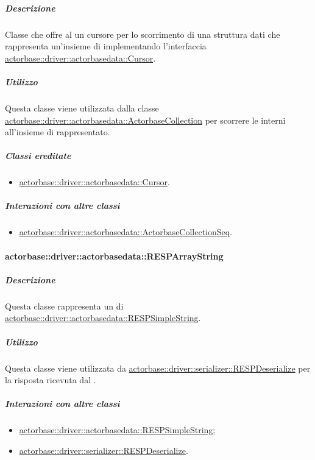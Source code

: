 \documentclass{scalatekids-article}
\begin{document}
\subparagraph{Descrizione}

Classe che offre al  un cursore per lo scorrimento di una struttura dati
che rappresenta un'insieme di  implementando l'interfaccia
\hyperref[sec:actorbase::driver::actorbasedata::Cursor]{actorbase::driver::actorbasedata::Cursor}.

\subparagraph{Utilizzo}

Questa classe viene utilizzata dalla classe
\hyperref[sec:actorbase::driver::actorbasedata::ActorbaseCollection]{actorbase::driver::actorbasedata::ActorbaseCollection}
per scorrere le  interni all'insieme di 
rappresentato.

\subparagraph{Classi ereditate}

\begin{itemize}
\item \hyperref[sec:actorbase::driver::actorbasedata::Cursor]{actorbase::driver::actorbasedata::Cursor}.
\end{itemize}

\subparagraph{Interazioni con altre classi}

\begin{itemize}
\item \hyperref[sec:actorbase::driver::actorbasedata::ActorbaseCollectionSeq]{actorbase::driver::actorbasedata::ActorbaseCollectionSeq}.
\end{itemize}

\paragraph{actorbase::driver::actorbasedata::RESPArrayString}
\label{sec:actorbase::driver::actorbasedata::RESPArrayString}

\subparagraph{Descrizione}

Questa classe rappresenta un  di
\hyperref[sec:actorbase::driver::actorbasedata::RESPSimpleString]{actorbase::driver::actorbasedata::RESPSimpleString}.

\subparagraph{Utilizzo}

Questa classe viene utilizzata da \hyperref[sec:actorbase::driver::serializer::RESPDeserialize]{actorbase::driver::serializer::RESPDeserialize}
per  la risposta ricevuta dal .

\subparagraph{Interazioni con altre classi}

\begin{itemize}
\item \hyperref[sec:actorbase::driver::actorbasedata::RESPSimpleString]{actorbase::driver::actorbasedata::RESPSimpleString};
\item \hyperref[sec:actorbase::driver::serializer::RESPDeserialize]{actorbase::driver::serializer::RESPDeserialize}.
\end{itemize}
\end{document}
